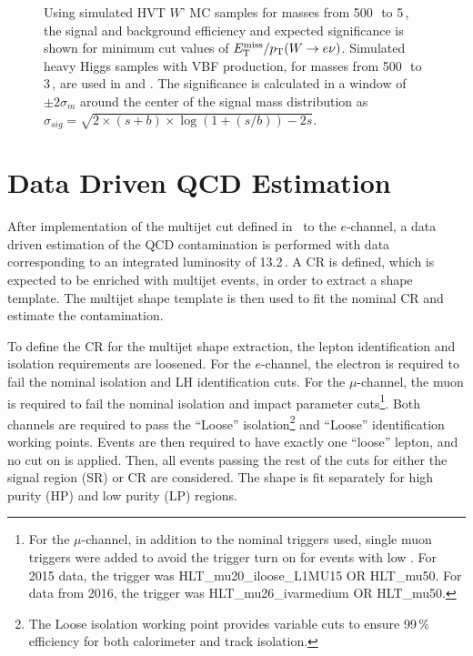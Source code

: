\begin{figure}[htb]
\caption[Signal efficiency and significance of multijet cut for an HVT $W$' and a heavy Higgs]{Using simulated HVT $W$' MC samples for masses from 500\,\GeV\, to 5\,\TeV, the \protect{} signal and background efficiency and \protect{} expected significance is shown for minimum cut values of $E_{\text{T}}^{\text{miss}}/p_{\text{T}}(W\rightarrow e\nu)$. Simulated heavy Higgs samples with VBF production, for masses from 500\,\GeV\, to 3\,\TeV, are used in \protect{} and \protect{}. The significance is calculated in a window of $\pm 2\sigma_m$ around the center of the signal mass distribution as $\sigma_{sig}=\sqrt{2\times(s+b)\times\log\left(1+(s/b)\right) - 2s}$.}
\label{fig:metpt_eff}
\end{figure}


%
\clearpage
\section{Data Driven QCD Estimation}
\label{ch:qcd:est}

After implementation of the multijet cut defined in~\Sect{\ref{ch:qcd:mjcut}} to the $e$-channel, a data driven estimation of the QCD contamination is performed with data corresponding to an integrated luminosity of 13.2\,\ifb. A CR is defined, which is expected to be enriched with multijet events, in order to extract a shape template. The multijet shape template is then used to fit the nominal \Wjets CR and estimate the contamination. 

To define the CR for the multijet shape extraction, the lepton identification and isolation requirements are loosened. For the $e$-channel, the electron is required to fail the nominal isolation and LH identification cuts. For the $\mu$-channel, the muon is required to fail the nominal isolation and impact parameter cuts\footnote{
	For the $\mu$-channel, in addition to the nominal \MET triggers used, single muon triggers were added to avoid the trigger turn on for events with low \MET. For 2015 data, the trigger was HLT\_mu20\_iloose\_L1MU15 OR HLT\_mu50. For data from 2016, the trigger was HLT\_mu26\_ivarmedium OR HLT\_mu50. 
}. Both channels are required to pass the ``Loose'' isolation\footnote{
The Loose isolation working point provides variable cuts to ensure 99\,\% efficiency for both calorimeter and track isolation.
} and ``Loose'' identification working points. Events are then required to have exactly one ``loose'' lepton, and no cut on \MET is applied. Then, all events passing the rest of the cuts for either the signal region (SR) or \Wjets CR are considered. The shape is fit separately for high purity (HP) and low purity (LP) regions. 

